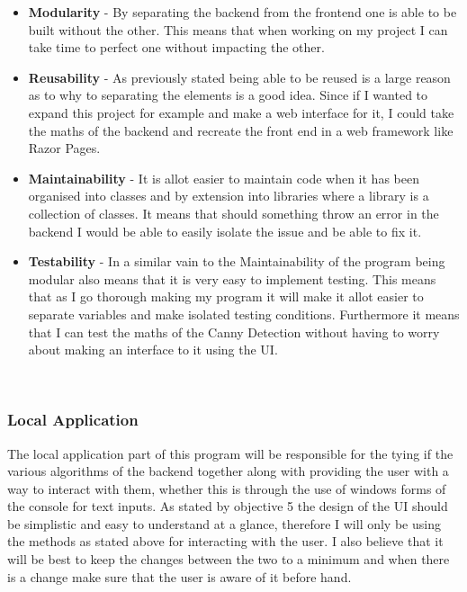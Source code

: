 \begin{FlushLeft}
    \begin{itemize}
        \item \textbf{Modularity} - By separating the backend from the frontend one is able to be built without the other. This means that when working on my project I can take time to perfect one without impacting the other.
        \item \textbf{Reusability} - As previously stated being able to be reused is a large reason as to why to separating the elements is a good idea. Since if I wanted to expand this project for example and make a web interface for it, I could take the maths of the backend and recreate the front end in a web framework like Razor Pages.
        \item \textbf{Maintainability} - It is allot easier to maintain code when it has been organised into classes and by extension into libraries where a library is a collection of classes. It means that should something throw an error in the backend I would be able to easily isolate the issue and be able to fix it.
        \item \textbf{Testability} - In a similar vain to the Maintainability of the program being modular also means that it is very easy to implement testing. This means that as I go thorough making my program it will make it allot easier to separate variables and make isolated testing conditions. Furthermore it means that I can test the maths of the Canny Detection without having to worry about making an interface to it using the UI.
    \end{itemize}
    \\ \BK

    \subsubsection{Local Application}
    The local application part of this program will be responsible for the tying if the various algorithms of the backend together along with providing the user with a way to interact with them, whether this is through the use of windows forms of the console for text inputs. As stated by objective 5 the design of the UI should be simplistic and easy to understand at a glance, therefore I will only be using the methods as stated above for interacting with the user. I also believe that it will be best to keep the changes between the two to a minimum and when there is a change make sure that the user is aware of it before hand.\\ \bk
    

\end{FlushLeft}
